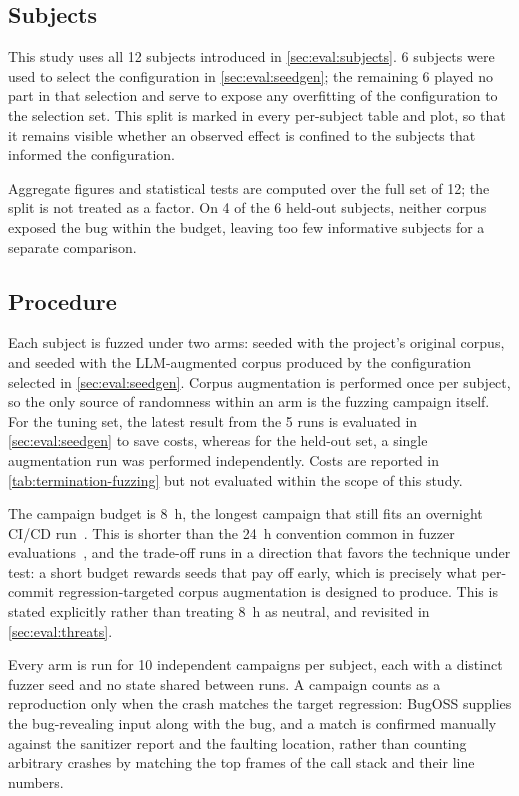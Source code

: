 \subsection{Subjects}\label{sec:eval:fuzzing:subjects}
This study uses all \num{12} subjects introduced in \autoref{sec:eval:subjects}.
\num{6} subjects were used to select the configuration in \autoref{sec:eval:seedgen}; the remaining \num{6} played no part in that selection and serve to expose any overfitting of the configuration to the selection set.
This split is marked in every per-subject table and plot, so that it remains visible whether an observed effect is confined to the subjects that informed the configuration.

Aggregate figures and statistical tests are computed over the full set of \num{12}; the split is not treated as a factor.
On \num{4} of the \num{6} held-out subjects, neither corpus exposed the bug within the budget, leaving too few informative subjects for a separate comparison.

\subsection{Procedure}\label{sec:eval:fuzzing:procedure}
Each subject is fuzzed under two arms: seeded with the project's original corpus, and seeded with the LLM-augmented corpus produced by the configuration selected in \autoref{sec:eval:seedgen}.
Corpus augmentation is performed once per subject, so the only source of randomness within an arm is the fuzzing campaign itself.
For the tuning set, the latest result from the \num{5} runs is evaluated in \cref{sec:eval:seedgen} to save costs, whereas for the held-out set, a single augmentation run was performed independently.
Costs are reported in \cref{tab:termination-fuzzing} but not evaluated within the scope of this study.

The campaign budget is \SI{8}{\hour}, the longest campaign that still fits an overnight CI/CD run~\cite{kloosterEffectivenessScalabilityFuzzing2022}.
This is shorter than the \SI{24}{\hour} convention common in fuzzer evaluations~\cite{klees2018}, and the trade-off runs in a direction that favors the technique under test: a short budget rewards seeds that pay off early, which is precisely what per-commit regression-targeted corpus augmentation is designed to produce.
This is stated explicitly rather than treating \SI{8}{\hour} as neutral, and revisited in \autoref{sec:eval:threats}.

Every arm is run for \num{10} independent campaigns per subject, each with a distinct fuzzer seed and no state shared between runs.
A campaign counts as a reproduction only when the crash matches the target regression: BugOSS supplies the bug-revealing input along with the bug, and a match is confirmed manually against the sanitizer report and the faulting location, rather than counting arbitrary crashes by matching the top frames of the call stack and their line numbers.

